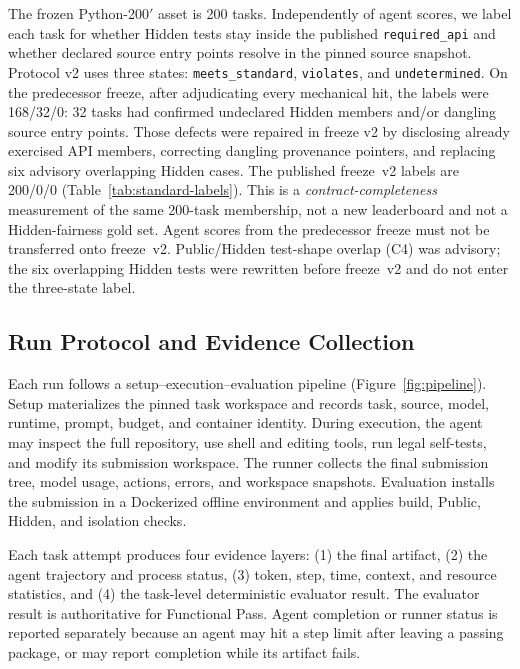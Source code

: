 \documentclass[acmsmall,anonymous,review,screen]{acmart}
\begin{document}
The frozen Python-200$'$ asset is 200 tasks. Independently of agent scores, we
label each task for whether Hidden tests stay inside the published
\texttt{required\_api} and whether declared source entry points resolve in the
pinned source snapshot. Protocol v2 uses three states:
\texttt{meets\_standard}, \texttt{violates}, and \texttt{undetermined}. On the
predecessor freeze, after adjudicating every mechanical hit, the labels were
168/32/0: 32 tasks had confirmed undeclared Hidden members and/or dangling
source entry points. Those defects were repaired in freeze v2 by disclosing
already exercised API members, correcting dangling provenance pointers, and
replacing six advisory overlapping Hidden cases. The published freeze~v2
labels are 200/0/0 (Table~\ref{tab:standard-labels}). This is a
\emph{contract-completeness} measurement of the same 200-task membership, not a
new leaderboard and not a Hidden-fairness gold set. Agent scores from the
predecessor freeze must not be transferred onto freeze~v2. Public/Hidden
test-shape overlap (C4) was advisory; the six overlapping Hidden tests were
rewritten before freeze~v2 and do not enter the three-state label.

\begin{table}[t]
  \caption{v2 contract-completeness labels on the frozen 200-task asset.
  Not a Functional Pass table.}
  \label{tab:standard-labels}
  \centering
  
\end{table}

\subsection{Run Protocol and Evidence Collection}

Each run follows a setup--execution--evaluation pipeline
(Figure~\ref{fig:pipeline}). Setup materializes the pinned task workspace and
records task, source, model, runtime, prompt, budget, and container identity.
During execution, the agent may inspect the full repository, use shell and
editing tools, run legal self-tests, and modify its submission workspace. The
runner collects the final submission tree, model usage, actions, errors, and
workspace snapshots. Evaluation installs the submission in a Dockerized
offline environment and applies build, Public, Hidden, and isolation checks.

Each task attempt produces four evidence layers: (1) the final artifact,
(2) the agent trajectory and process status, (3) token, step, time, context,
and resource statistics, and (4) the task-level deterministic evaluator result.
The evaluator result is authoritative for Functional Pass. Agent completion or
runner status is reported separately because an agent may hit a step limit after
leaving a passing package, or may report completion while its artifact fails.
\end{document}
